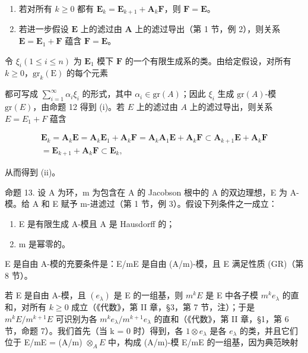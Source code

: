 \begin{enumerate}
\def\labelenumi{(\roman{enumi})}
\item
  若对所有 \(k \geqslant 0\) 都有 \(\mathbf{E}_k = \mathbf{E}_{k+1} + \mathbf{A}_k\mathbf{F}\)，则 \(\mathbf{F} = \mathbf{E}\)。
\item
  若进一步假设 \(\mathbf{E}\) 上的滤过由 \(\mathbf{A}\) 上的滤过导出（第 1 节，例 2），则关系 \(\mathbf{E} = \mathbf{E}_1 + \mathbf{F}\) 蕴含 \(\mathbf{F} = \mathbf{E}\)。
\end{enumerate}

	令 \(\xi_{i}(1\leqslant i\leqslant n)\) 为 \(\mathbf{E}_1\) 模下 \(\mathbf{F}\) 的一个有限生成系的类。由给定假设，对所有 \(k\geqslant 0\)，\(\mathrm{gr}_k(\mathrm{E})\) 的每个元素

	都可写成 \(\sum_{i=1}^{\infty} \alpha_i \xi_i\) 的形式，其中 \(\alpha_i \in \mathrm{gr}(A)\)；因此 \(\xi_i\) 生成 \(\mathrm{gr}(A)\)-模 \(\mathrm{gr}(E)\)，由命题 12 得到 (i)。若 \(E\) 上的滤过由 \(A\) 上的滤过导出，则关系 \(E = E_1 + F\) 蕴含

\[
\begin{array}{r} \mathbf {E} _ {k} = \mathbf {A} _ {k} \mathbf {E} = \mathbf {A} _ {k} \mathbf {E} _ {1} + \mathbf {A} _ {k} \mathbf {F} = \mathbf {A} _ {k} \mathbf {A} _ {1} \mathbf {E} + \mathbf {A} _ {k} \mathbf {F} \subset \mathbf {A} _ {k + 1} \mathbf {E} + \mathbf {A} _ {k} \mathbf {F} \\ = \mathbf {E} _ {k + 1} + \mathbf {A} _ {k} \mathbf {F} \subset \mathbf {E} _ {k}, \end{array}
\]

从而得到 (ii)。

命题 13. 设 A 为环，m 为包含在 A 的 Jacobson 根中的 A 的双边理想，E 为 A-模。给 A 和 E 赋予 m-进滤过（第 1 节，例 3）。假设下列条件之一成立：

\begin{enumerate}
\def\labelenumi{(\alph{enumi})}
\item
  E 是有限生成 A-模且 A 是 Hausdorff 的；
\item
  m 是幂零的。
\end{enumerate}

E 是自由 A-模的充要条件是：E/mE 是自由 (A/m)-模，且 E 满足性质 (GR)（第 8 节）。

	若 E 是自由 A-模，且 \((e_{\lambda})\) 是 E 的一组基，则 \(m^{k}E\) 是 E 中各子模 \(m^{k}e_{\lambda}\) 的直和，对所有 \(k \geqslant 0\) 成立（《代数》，第 II 章，§3，第 7 节，注）；于是 \(m^{k}E/m^{k+1}E\) 可识别为各 \(m^{k}e_{\lambda}/m^{k+1}e_{\lambda}\) 的直和（《代数》，第 II 章，§1，第 6 节，命题 7）。我们首先（当 k = 0 时）得到，各 \(1 \otimes e_{\lambda}\) 是各 \(e_{\lambda}\) 的类，并且它们位于 E/mE = (A/m) \(\otimes_{A} E\) 中，构成 (A/m)-模 E/mE 的一组基，因为典范映射

